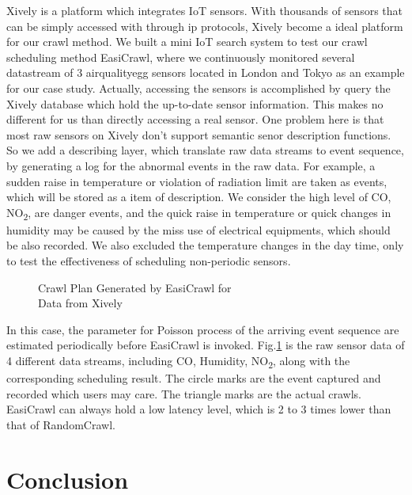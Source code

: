 \documentclass[conference]{IEEEtran}
\begin{document}
Xively is a platform which integrates IoT sensors. 
With thousands of sensors that can be simply accessed with through ip protocols, Xively become a ideal platform for our crawl method.
We built a mini IoT search system to test our crawl scheduling method EasiCrawl, where we continuously monitored several datastream of 3 airqualityegg\cite{airegg} sensors located in London and Tokyo as an example for our case study. 
Actually, accessing the sensors is accomplished by query the Xively database which hold the up-to-date sensor information. 
This makes no different for us than directly accessing a real sensor. 
One problem here is that most raw sensors on Xively don't support semantic senor description functions. 
So we add a describing layer, which translate raw data streams to event sequence, by generating a log for the abnormal events in the raw data. 
For example, a sudden raise in temperature or violation of radiation limit are taken as events, which will be stored as a item of description.
We consider the high level of CO, NO\textsubscript{2}, are danger events, and the quick raise in temperature or quick changes in humidity may be caused by the miss use of electrical equipments, which should be also recorded. 
We also excluded the temperature changes in the day time, only to test the effectiveness of scheduling non-periodic sensors.

\begin{figure}
	\centering
	\hspace{-1.0em}
	
	\captionsetup{justification=centering}
	\caption{Crawl Plan Generated by EasiCrawl for \\
		Data from Xively}
	\label{fig:xivelycasestudy}
\end{figure}

In this case, the parameter for Poisson process of the arriving event sequence are estimated periodically before EasiCrawl is invoked.
Fig.\ref{fig:xivelycasestudy} is the raw sensor data of 4 different data streams, including CO, Humidity, NO\textsubscript{2}, along with the corresponding scheduling result. 
The circle marks are the event captured and recorded which users may care. 
The triangle marks are the actual crawls. 
EasiCrawl can always hold a low latency level, which is 2 to 3 times lower than that of RandomCrawl.


\section{Conclusion} \label{conclusion}
\end{document}
